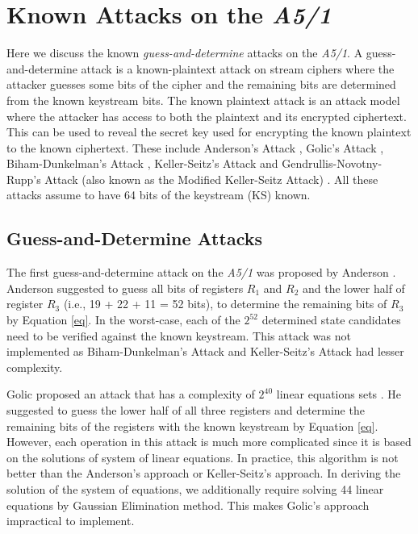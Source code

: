 \documentclass{llncs}
\begin{document}
\section{Known Attacks on the \emph{A5/1}}
Here we discuss the known \emph{guess-and-determine} attacks on the \emph{A5/1}. A guess-and-determine attack \cite{[Men]} is a known-plaintext attack on stream ciphers where the attacker guesses some bits of the cipher and the remaining bits are determined from the known keystream bits. The known plaintext attack is an attack model where the attacker has access to both the plaintext and its encrypted ciphertext. This can be used to reveal the secret key used for encrypting the known plaintext to the known ciphertext. These include Anderson's Attack \cite{[And]}, Golic's Attack \cite{[Golic]}, Biham-Dunkelman's Attack \cite{[BD]}, Keller-Seitz's Attack \cite{[KS01]} and Gendrullis-Novotny-Rupp's Attack (also known as the Modified Keller-Seitz Attack) \cite{[Rupp]}. All these attacks assume to have 64 bits of the keystream (KS) known.

\subsection{Guess-and-Determine Attacks}
The first guess-and-determine attack on the \emph{A5/1} was proposed by Anderson \cite{[And]}. Anderson suggested to guess all bits of registers $R_{1}$ and $R_{2}$ and the lower half of register $R_{3}$ (i.e., 19 + 22 + 11 = 52 bits), to determine the remaining bits of $R_3$ by Equation \ref {eq}. In the worst-case, each of the $2^{52}$ determined state candidates need to be verified against the known keystream. This attack was not implemented as Biham-Dunkelman's Attack and Keller-Seitz's Attack had lesser complexity.

Golic proposed an attack that has a complexity of $2^{40}$ linear equations sets \cite{[Golic]}. He suggested to guess the lower half of all three registers and determine the remaining bits of the registers with the known keystream by Equation \ref{eq}. However, each operation in this attack is much more complicated since it is based on the solutions of system of linear equations. In practice, this algorithm is not better than the Anderson's approach \cite{[And]} or Keller-Seitz's \cite{[KS01]} approach. In deriving the solution of the system of equations, we additionally require solving 44 linear equations by Gaussian Elimination method. This makes Golic's approach impractical to implement.
\end{document}
